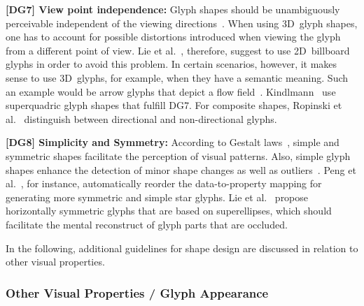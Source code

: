 \textbf{[DG7] View point independence:}
Glyph shapes should be unambiguously perceivable independent of the viewing directions~\cite{Ropinski11glyphs}.
When using 3D~glyph shapes, one has to account for possible distortions introduced when viewing the glyph from a different point of view.
Lie et al.~\cite{lie09glyphs}, therefore, suggest to use 2D~billboard glyphs in order to avoid this problem. %
In certain scenarios, however, it makes sense to use 3D~glyphs, for example, when they have a semantic meaning. Such an example would be arrow glyphs that depict a flow field~\cite{crawfisMax93textureSplats}.
Kindlmann~\cite{kindlmann04superquad} use super\-quadric glyph shapes that fulfill DG7.
For composite shapes, Ropinski et al.~\cite{Ropinski11glyphs} distinguish between directional and non-directional glyphs.

\textbf{[DG8] Simplicity and Symmetry:} According to Gestalt laws~\cite{ware04infoVis}, simple and symmetric shapes facilitate the perception of visual patterns.
Also, simple glyph shapes enhance the detection of minor shape changes as well as outliers~\cite{ward08glyphs}.
Peng et al.~\cite{Peng04dimensionReordering}, for instance, automatically reorder the data-to-property mapping for generating more symmetric and simple star glyphs.
Lie et al.~\cite{lie09glyphs} propose horizontally symmetric glyphs that are based on superellipses, which should facilitate the mental reconstruct of glyph parts that are occluded.


In the following, additional guidelines for shape design are discussed in relation to other visual properties.


\subsubsection{Other Visual Properties / Glyph Appearance}


